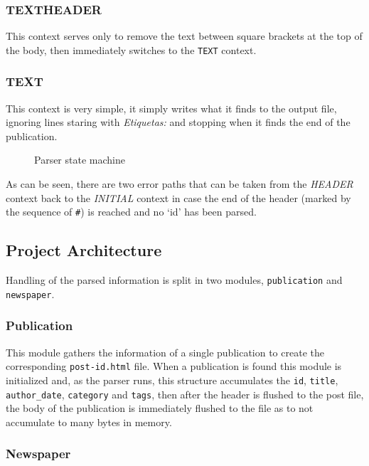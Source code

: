 \documentclass[a4paper]{article}
\begin{document}
\subsubsection{TEXTHEADER}

This context serves only to remove the text between square brackets at the top
of the body, then immediately switches to the \texttt{TEXT} context.

\subsubsection{TEXT}

This context is very simple, it simply writes what it finds to the output file,
ignoring lines staring with \textit{Etiquetas:} and stopping when it finds the
end of the publication.

\begin{figure}[H]
    
    \caption{Parser state machine}
\end{figure}

As can be seen, there are two error paths that can be taken from the
\textit{HEADER} context back to the \textit{INITIAL} context in case the end of
the header (marked by the sequence of \verb!#!) is reached and no `id' has been
parsed.

\subsection{Project Architecture}

Handling of the parsed information is split in two modules,
\texttt{publication} and \texttt{newspaper}.

\subsubsection{Publication}

This module gathers the information of a single publication to create the
corresponding \texttt{post-id.html} file. When a publication is found this
module is initialized and, as the parser runs, this structure accumulates the
\texttt{id}, \texttt{title}, \texttt{author\_date}, \texttt{category} and
\texttt{tags}, then after the header is flushed to the post file, the body of
the publication is immediately flushed to the file as to not accumulate to many
bytes in memory.

\subsubsection{Newspaper}
\end{document}
